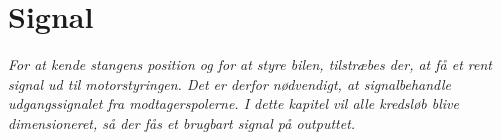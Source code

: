 \chapter{Signal}\label{kap:chap_signal}
\emph{For at kende stangens position og for at styre bilen, tilstræbes der, at få et rent signal ud til motorstyringen. Det er derfor nødvendigt, at signalbehandle udgangssignalet fra modtagerspolerne. I dette kapitel vil alle kredsløb blive dimensioneret, så der fås et brugbart signal på outputtet. }